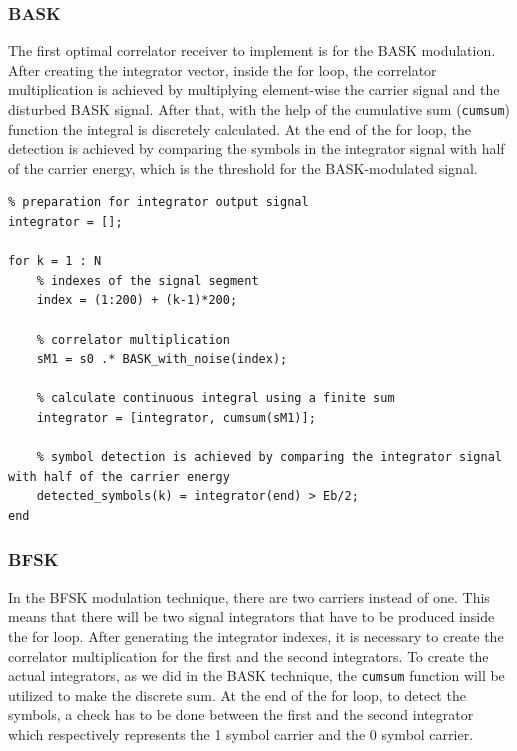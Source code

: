 \subsubsection*{BASK}
The first optimal correlator receiver to implement is for the BASK modulation. After creating the integrator vector, inside the for loop, the correlator multiplication is achieved by multiplying element-wise the carrier signal and the disturbed BASK signal. After that, with the help of the cumulative sum (\texttt{cumsum}) function the integral is discretely calculated. At the end of the for loop, the detection is achieved by comparing the symbols in the integrator signal with half of the carrier energy, which is the threshold for the BASK-modulated signal.

\begin{lstlisting}
% preparation for integrator output signal 
integrator = []; 

for k = 1 : N
    % indexes of the signal segment
    index = (1:200) + (k-1)*200;

    % correlator multiplication 
    sM1 = s0 .* BASK_with_noise(index);  

    % calculate continuous integral using a finite sum
    integrator = [integrator, cumsum(sM1)]; 

    % symbol detection is achieved by comparing the integrator signal with half of the carrier energy
    detected_symbols(k) = integrator(end) > Eb/2;
end
\end{lstlisting}

\subsubsection*{BFSK}
In the BFSK modulation technique, there are two carriers instead of one. This means that there will be two signal integrators that have to be produced inside the for loop. After generating the integrator indexes, it is necessary to create the correlator multiplication for the first and the second integrators. To create the actual integrators, as we did in the BASK technique, the \texttt{cumsum} function will be utilized to make the discrete sum. At the end of the for loop, to detect the symbols, a check has to be done between the first and the second integrator which respectively represents the 1 symbol carrier and the 0 symbol carrier. 

